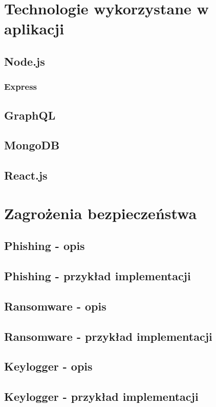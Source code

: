 \documentclass[12pt,twoside]{article}
\begin{document}
\clearpage

\section{Technologie wykorzystane w aplikacji}

\subsection{Node.js}
\subsubsection{Express}
\subsection{GraphQL}
\subsection{MongoDB}
\subsection{React.js}

\clearpage
\section{Zagrożenia bezpieczeństwa}

\subsection{Phishing - opis}
\subsection{Phishing - przykład implementacji}

\subsection{Ransomware - opis}
\subsection{Ransomware - przykład implementacji}

\subsection{Keylogger - opis}
\subsection{Keylogger - przykład implementacji}
\end{document}
